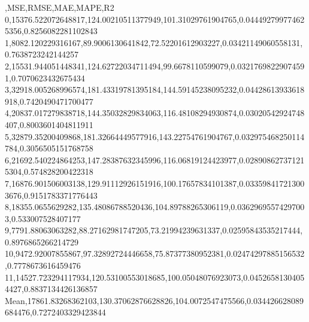 ,MSE,RMSE,MAE,MAPE,R2
0,15376.522072648817,124.00210511377949,101.31029761904765,0.044492799774625356,0.8256082281102843
1,8082.120229316167,89.9006130641842,72.52201612903227,0.03421149060558131,0.7638723242144257
2,15531.944051448341,124.62722034711494,99.6678110599079,0.03217698229074591,0.7070623432675434
3,32918.005268996574,181.43319781395184,144.59145238095232,0.04428613933618918,0.7420490471700477
4,20837.017279838718,144.35032829834063,116.48108294930874,0.03020542924748407,0.8003601404811911
5,32879.35200409868,181.32664449577916,143.22754761904767,0.032975468250114784,0.3056505151768758
6,21692.540224864253,147.28387632345996,116.06819124423977,0.028908627371215304,0.574828200422318
7,16876.901506003138,129.91112926151916,100.17657834101387,0.033598417213003676,0.9151783371776443
8,18355.0655629282,135.48086788520436,104.89788265306119,0.03629695574297003,0.533007528407177
9,7791.88063063282,88.27162981747205,73.21994239631337,0.02595843535217444,0.8976865266214729
10,9472.92007855867,97.32892724446658,75.87377380952381,0.02474297885156532,0.7778673616459476
11,14527.723294117934,120.53100553018685,100.05048076923073,0.04526581304054427,0.8837134426136857
Mean,17861.83268362103,130.37062876628826,104.0072547475566,0.034426628089684476,0.7272403329423844
